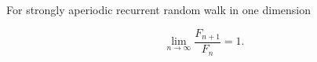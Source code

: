 For strongly aperiodic recurrent random walk in one dimension

$$\lim_{n \to \infty} \frac{F_{n+1}}{F_n} = 1.$$
